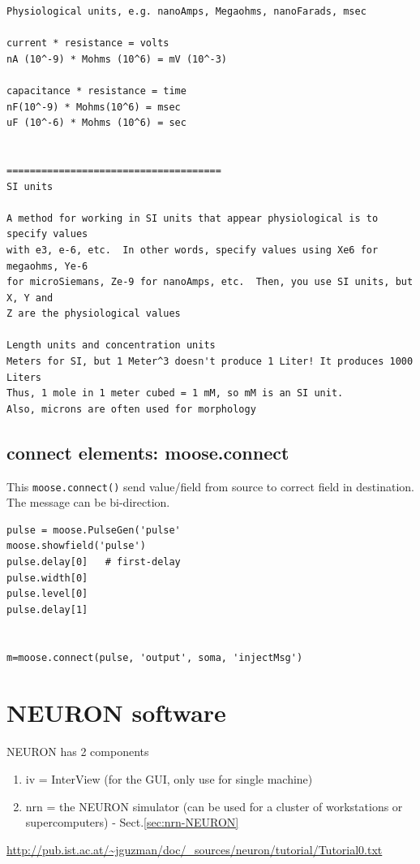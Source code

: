 \begin{verbatim}
Physiological units, e.g. nanoAmps, Megaohms, nanoFarads, msec

current * resistance = volts
nA (10^-9) * Mohms (10^6) = mV (10^-3)

capacitance * resistance = time
nF(10^-9) * Mohms(10^6) = msec
uF (10^-6) * Mohms (10^6) = sec


=====================================
SI units

A method for working in SI units that appear physiological is to specify values
with e3, e-6, etc.  In other words, specify values using Xe6 for megaohms, Ye-6
for microSiemans, Ze-9 for nanoAmps, etc.  Then, you use SI units, but X, Y and
Z are the physiological values   

Length units and concentration units
Meters for SI, but 1 Meter^3 doesn't produce 1 Liter! It produces 1000 Liters
Thus, 1 mole in 1 meter cubed = 1 mM, so mM is an SI unit.
Also, microns are often used for morphology
\end{verbatim}


\subsection{connect elements: moose.connect}

This \verb!moose.connect()! send value/field from source to correct field in
destination. The message can be bi-direction. 

\begin{verbatim}
pulse = moose.PulseGen('pulse'
moose.showfield('pulse')
pulse.delay[0]   # first-delay
pulse.width[0]
pulse.level[0]
pulse.delay[1]


m=moose.connect(pulse, 'output', soma, 'injectMsg')
\end{verbatim}



\section{NEURON software}
\label{sec:NEURON}

NEURON has 2 components
\begin{enumerate}
  \item iv = InterView (for the GUI, only use for single machine)
  
  \item nrn = the NEURON simulator (can be used for a cluster of workstations
  or supercomputers) - Sect.\ref{sec:nrn-NEURON}
  
\end{enumerate}
\url{http://pub.ist.ac.at/~jguzman/doc/_sources/neuron/tutorial/Tutorial0.txt}

